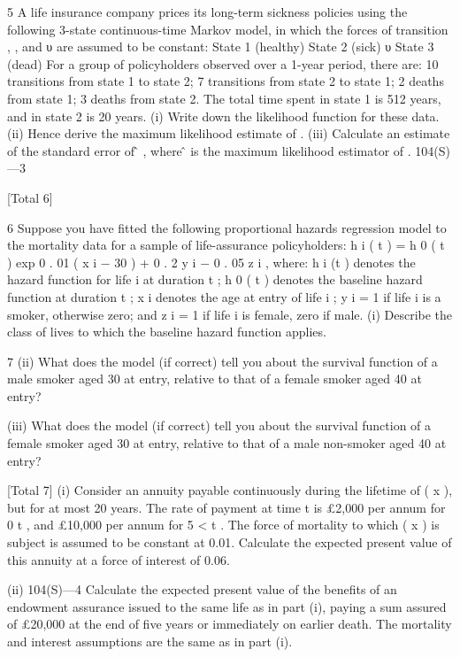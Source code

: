 5
A life insurance company prices its long-term sickness policies using the following
3-state continuous-time Markov model, in which the forces of transition \sigma, \rho, \mu
and υ are assumed to be constant:
\sigma
State 1
(healthy)
\mu
State 2
(sick)
\rho
υ
State 3
(dead)
For a group of policyholders observed over a 1-year period, there are:
10 transitions from state 1 to state 2;
7 transitions from state 2 to state 1;
2 deaths from state 1;
3 deaths from state 2.
The total time spent in state 1 is 512 years, and in state 2 is 20 years.
(i) Write down the likelihood function for these data. 
(ii) Hence derive the maximum likelihood estimate of \sigma. 
(iii) Calculate an estimate of the standard error of \sigmâ , where \sigmâ is the
maximum likelihood estimator of \sigma .
104(S)—3

[Total 6]

6
Suppose you have fitted the following proportional hazards regression model to
the mortality data for a sample of life-assurance policyholders:
h i ( t ) = h 0 ( t ) exp { 0 . 01 ( x i − 30 ) + 0 . 2 y i − 0 . 05 z i } ,
where:
h i (t ) denotes the hazard function for life i at duration t ;
h 0 ( t ) denotes the baseline hazard function at duration t ;
x i denotes the age at entry of life i ;
y i = 1 if life i is a smoker, otherwise zero; and
z i = 1 if life i is female, zero if male.
(i)
Describe the class of lives to which the baseline hazard function applies.

7
(ii) What does the model (if correct) tell you about the survival function of a
male smoker aged 30 at entry, relative to that of a female smoker aged 40
at entry?

(iii) What does the model (if correct) tell you about the survival function of a
female smoker aged 30 at entry, relative to that of a male non-smoker
aged 40 at entry?

[Total 7]
(i) Consider an annuity payable continuously during the lifetime of ( x ), but
for at most 20 years. The rate of payment at time t is £2,000 per annum
for 0 \leq t , and £10,000 per annum for 5 < t . The force of mortality
to which ( x ) is subject is assumed to be constant at 0.01.
Calculate the expected present value of this annuity at a force of interest
of 0.06.

(ii)
104(S)—4
Calculate the expected present value of the benefits of an endowment
assurance issued to the same life as in part (i), paying a sum assured of
£20,000 at the end of five years or immediately on earlier death. The
mortality and interest assumptions are the same as in part (i).



